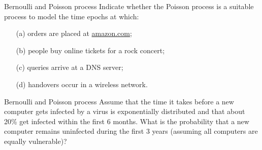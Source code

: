 \begin{problem}{Bernoulli and Poisson process}
Indicate whether the Poisson process is a suitable process to model the time epochs at which:
\begin{itemize}
    \item[(a)] orders are placed at \url{amazon.com};
    \item[(b)] people buy online tickets for a rock concert;
    \item[(c)] queries arrive at a DNS server;
    \item[(d)] handovers occur in a wireless network.
\end{itemize}
\end{problem}

\begin{problem}{Bernoulli and Poisson process}
Assume that the time it takes before a new computer gets infected by a virus is exponentially distributed and that about 20\% get infected within the first 6 months. What is the probability that a new computer remains uninfected during the first 3 years (assuming all computers are equally vulnerable)?
\end{problem}

